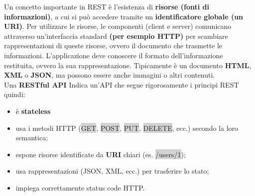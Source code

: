 Un concetto importante in REST è l'esistenza di \textbf{risorse (fonti di informazioni)}, a cui si può accedere tramite un \textbf{identificatore globale (un URI)}. Per utilizzare le risorse, le componenti (client e server) comunicano attraverso un'interfaccia standard \textbf{(per esempio HTTP)} per scambiare rappresentazioni di queste risorse, ovvero il documento che trasmette le informazioni. 
L'applicazione deve conoscere il formato dell'informazione restituita, ovvero la sua rappresentazione. Tipicamente è un documento \textbf{HTML}, \textbf{XML} o \textbf{JSON}, ma possono essere anche immagini o altri contenuti.
\\
Una \textbf{RESTful API} Indica un’API che segue rigorosamente i principi REST quindi:

\begin{itemize}
	\item è \textbf{stateless}
	\item usa i metodi HTTP (\colorbox{lightgray}{GET}, \colorbox{lightgray}{POST}, \colorbox{lightgray}{PUT}, \colorbox{lightgray}{DELETE}, ecc.) secondo la loro semantica;
	\item espone risorse identificate da \textbf{URI} chiari (es. \colorbox{lightgray}{/users/1});
	\item usa rappresentazioni (JSON, XML, ecc.) per trasferire lo stato;
	\item impiega correttamente status code HTTP.
\end{itemize}